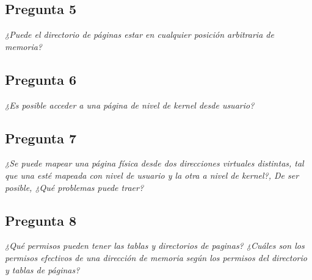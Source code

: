 \begin{minipage}{\linewidth}
	\subsection{Pregunta 5}
		\begin{minipage}{\linewidth}
			\textit{¿Puede el directorio de páginas estar en cualquier posición arbitraria de
memoria?}

			
		\end{minipage}
\end{minipage}

\begin{minipage}{\linewidth}
	\subsection{Pregunta 6}
		\begin{minipage}{\linewidth}
			\textit{¿Es posible acceder a una página de nivel de kernel desde usuario?}
			
			
		\end{minipage}
\end{minipage}

\begin{minipage}{\linewidth}
	\subsection{Pregunta 7}
		\begin{minipage}{\linewidth}
			\textit{¿Se puede mapear una página física desde dos direcciones virtuales distintas, tal que una esté mapeada con nivel de usuario y la otra a nivel de kernel?, De ser posible, ¿Qué problemas puede traer?}
			
			
		\end{minipage}
\end{minipage}

\begin{minipage}{\linewidth}
	\subsection{Pregunta 8}
		\begin{minipage}{\linewidth}
			\textit{¿Qué permisos pueden tener las tablas y directorios de paginas? ¿Cuáles son los permisos efectivos de una dirección de memoria según los permisos del directorio y tablas de páginas?}
			
			
		\end{minipage}
\end{minipage}

